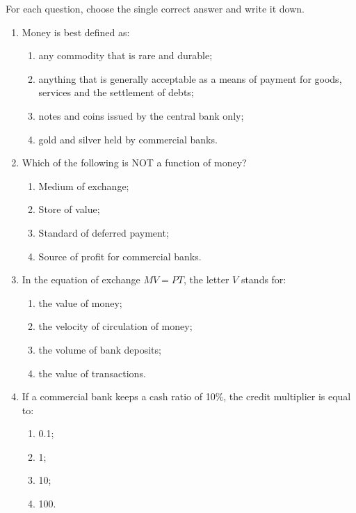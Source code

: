 \documentclass[11pt]{article}
\begin{document}
\begin{exercice}
For each question, choose the single correct answer and write it down.
\begin{enumerate}
\item Money is best defined as:
\begin{enumerate}
\item any commodity that is rare and durable;
\item anything that is generally acceptable as a means of payment for goods, services and the settlement of debts;
\item notes and coins issued by the central bank only;
\item gold and silver held by commercial banks.
\end{enumerate}
\item Which of the following is NOT a function of money?
\begin{enumerate}
\item Medium of exchange;
\item Store of value;
\item Standard of deferred payment;
\item Source of profit for commercial banks.
\end{enumerate}
\item In the equation of exchange $MV = PT$, the letter $V$ stands for:
\begin{enumerate}
\item the value of money;
\item the velocity of circulation of money;
\item the volume of bank deposits;
\item the value of transactions.
\end{enumerate}
\item If a commercial bank keeps a cash ratio of 10\%, the credit multiplier is equal to:
\begin{enumerate}
\item 0.1; \item 1; \item 10; \item 100.
\end{enumerate}
\end{enumerate}
\end{exercice}
\end{document}
